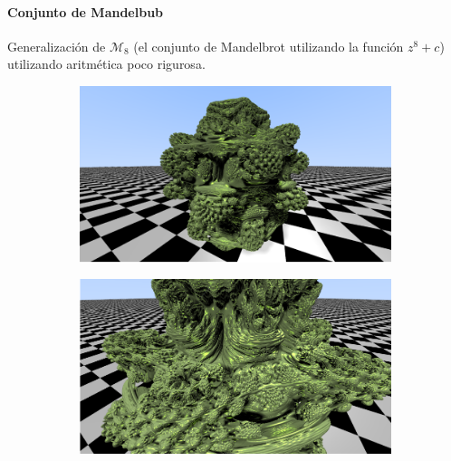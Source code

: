 \begin{frame}{\insertsectionhead}
\framesubtitle{Conjunto de Mandelbub}

{\large Generalización de $\mathcal{M}_8$ (el conjunto de Mandelbrot utilizando la función $z^8+c$) utilizando aritmética poco rigurosa.

    \begin{figure}[ht!]
    \hspace{\fill}
    \begin{subfigure}[b]{0.4\textwidth}
      \includegraphics[width=\textwidth]{screenshots/mandelbub-1.png}
    \end{subfigure}
    \hspace{\fill}
    \begin{subfigure}[b]{0.4\textwidth}
      \includegraphics[width=\textwidth]{screenshots/mandelbub-2.png}
    \end{subfigure}
    \hspace{\fill}
    \end{figure}

}
    
\end{frame}

